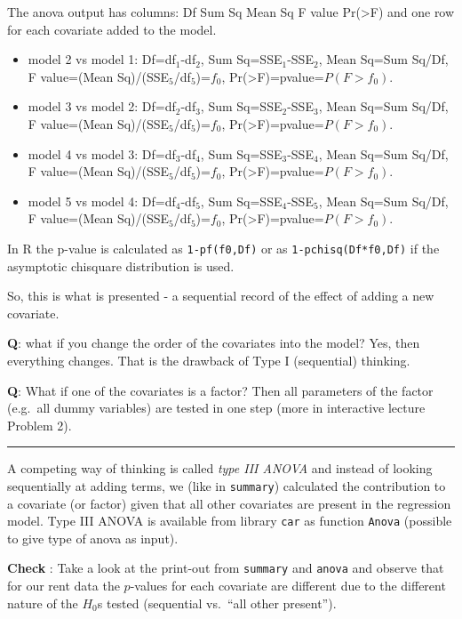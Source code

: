 \documentclass[
]{article}
\begin{document}
The anova output has columns: Df Sum Sq Mean Sq F value
Pr(\textgreater F) and one row for each covariate added to the model.

\begin{itemize}
\item
  model 2 vs model 1: Df=df\(_1\)-df\(_2\), Sum Sq=SSE\(_1\)-SSE\(_2\),
  Mean Sq=Sum Sq/Df, F value=(Mean Sq)/(SSE\(_5\)/df\(_5\))=\(f_0\),
  Pr(\textgreater F)=pvalue=\(P(F>f_0)\).
\item
  model 3 vs model 2: Df=df\(_2\)-df\(_3\), Sum Sq=SSE\(_2\)-SSE\(_3\),
  Mean Sq=Sum Sq/Df, F value=(Mean Sq)/(SSE\(_5\)/df\(_5\))=\(f_0\),
  Pr(\textgreater F)=pvalue=\(P(F>f_0)\).
\item
  model 4 vs model 3: Df=df\(_3\)-df\(_4\), Sum Sq=SSE\(_3\)-SSE\(_4\),
  Mean Sq=Sum Sq/Df, F value=(Mean Sq)/(SSE\(_5\)/df\(_5\))=\(f_0\),
  Pr(\textgreater F)=pvalue=\(P(F>f_0)\).
\item
  model 5 vs model 4: Df=df\(_4\)-df\(_5\), Sum Sq=SSE\(_4\)-SSE\(_5\),
  Mean Sq=Sum Sq/Df, F value=(Mean Sq)/(SSE\(_5\)/df\(_5\))=\(f_0\),
  Pr(\textgreater F)=pvalue=\(P(F>f_0)\).
\end{itemize}

In R the p-value is calculated as \texttt{1-pf(f0,Df)} or as
\texttt{1-pchisq(Df*f0,Df)} if the asymptotic chisquare distribution is
used.

So, this is what is presented - a sequential record of the effect of
adding a new covariate.

\textbf{Q}: what if you change the order of the covariates into the
model? Yes, then everything changes. That is the drawback of Type I
(sequential) thinking.

\textbf{Q}: What if one of the covariates is a factor? Then all
parameters of the factor (e.g.~all dummy variables) are tested in one
step (more in interactive lecture Problem 2).

\begin{center}\rule{0.5\linewidth}{0.5pt}\end{center}

A competing way of thinking is called \emph{type III ANOVA} and instead
of looking sequentially at adding terms, we (like in \texttt{summary})
calculated the contribution to a covariate (or factor) given that all
other covariates are present in the regression model. Type III ANOVA is
available from library \texttt{car} as function \texttt{Anova} (possible
to give type of anova as input).

\textbf{Check} : Take a look at the print-out from \texttt{summary} and
\texttt{anova} and observe that for our rent data the \(p\)-values for
each covariate are different due to the different nature of the \(H_0\)s
tested (sequential vs.~``all other present'').
\end{document}
